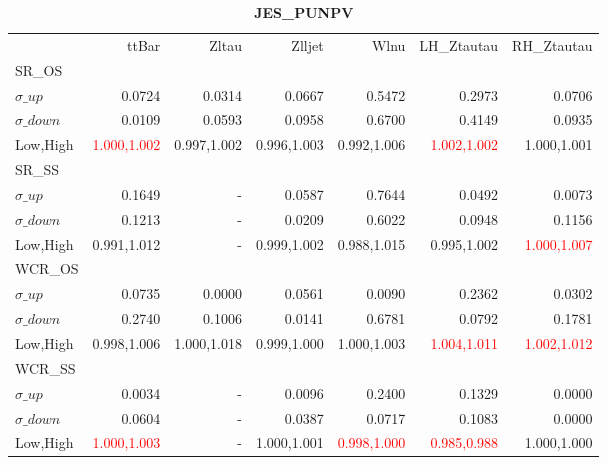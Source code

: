 \documentclass[11pt,oneside,a4paper]{article}
\begin{document}
\begin{table}
\caption{\bf{JES\_PUNPV}}
\centering
\begin{tabular}{lrrrrrr}
& ttBar & Zltau & Zlljet & Wlnu & LH\_Ztautau & RH\_Ztautau \\

SR\_OS &  &  &  &  &  &  \\
$\sigma\_up$ & 0.0724 & 0.0314 & 0.0667 & 0.5472 & 0.2973 & 0.0706 \\
$\sigma\_down$ & 0.0109 & 0.0593 & 0.0958 & 0.6700 & 0.4149 & 0.0935 \\
Low,High & \textcolor{red}{1.000,1.002} & 0.997,1.002 & 0.996,1.003 & 0.992,1.006 & \textcolor{red}{1.002,1.002} & 1.000,1.001 \\

\hline
SR\_SS &  &  &  &  &  &  \\
$\sigma\_up$ & 0.1649 & - & 0.0587 & 0.7644 & 0.0492 & 0.0073 \\
$\sigma\_down$ & 0.1213 & - & 0.0209 & 0.6022 & 0.0948 & 0.1156 \\
Low,High & 0.991,1.012 & - & 0.999,1.002 & 0.988,1.015 & 0.995,1.002 & \textcolor{red}{1.000,1.007} \\

\hline
WCR\_OS &  &  &  &  &  &  \\
$\sigma\_up$ & 0.0735 & 0.0000 & 0.0561 & 0.0090 & 0.2362 & 0.0302 \\
$\sigma\_down$ & 0.2740 & 0.1006 & 0.0141 & 0.6781 & 0.0792 & 0.1781 \\
Low,High & 0.998,1.006 & 1.000,1.018 & 0.999,1.000 & 1.000,1.003 & \textcolor{red}{1.004,1.011} & \textcolor{red}{1.002,1.012} \\

\hline
WCR\_SS &  &  &  &  &  &  \\
$\sigma\_up$ & 0.0034 & - & 0.0096 & 0.2400 & 0.1329 & 0.0000 \\
$\sigma\_down$ & 0.0604 & - & 0.0387 & 0.0717 & 0.1083 & 0.0000 \\
Low,High & \textcolor{red}{1.000,1.003} & - & 1.000,1.001 & \textcolor{red}{0.998,1.000} & \textcolor{red}{0.985,0.988} & 1.000,1.000 \\

\end{tabular}
\end{table}
\end{document}
